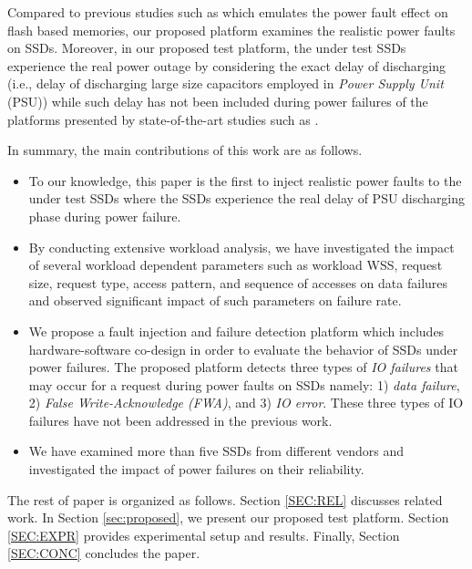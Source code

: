 Compared to previous studies such as \cite{kim2007virtual} which emulates the power fault effect on flash based memories, our proposed platform examines the realistic power faults on SSDs. Moreover, in our proposed test platform, the under test SSDs experience the real power outage by considering the exact delay of discharging (i.e., delay of discharging large size capacitors employed in \emph{Power Supply Unit} (PSU)) while such delay has not been included during power failures of the platforms presented by state-of-the-art studies such as \cite{tseng2011understanding, zheng2013understanding}.

In summary, the main contributions of this work are as follows.
\begin{itemize}
\item To our knowledge, this paper is the first to inject realistic power faults to the under test SSDs where the SSDs experience the real delay of PSU discharging phase during power failure.

\item By conducting extensive workload analysis, we have investigated the impact of several workload dependent parameters such as workload WSS, request size, request type, access pattern, and sequence of accesses on data failures and observed significant impact of such parameters on failure rate.

\item We propose a fault injection and failure detection platform which includes hardware-software co-design in order to evaluate the behavior of SSDs under power failures. The proposed platform detects three types of \emph{IO failures} that may occur for a request during power faults on SSDs namely: 1) \emph{data failure}, 2) \emph{False Write-Acknowledge (FWA)}, and 3) \emph{IO error}. These three types of IO failures have not been addressed in the previous work.

\item We have examined more than five SSDs from different vendors and investigated the impact of power failures on their reliability.



\end{itemize} 
The rest of paper is organized as follows. Section \ref{SEC:REL} discusses related work. In Section \ref{sec:proposed}, we present our proposed test platform. Section \ref{SEC:EXPR} provides experimental setup and results. Finally, Section \ref{SEC:CONC} concludes the paper.


